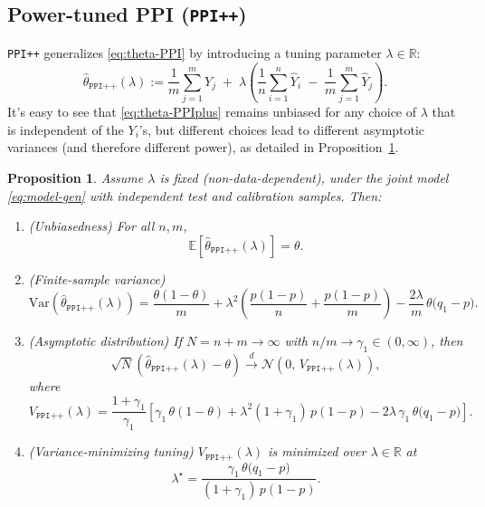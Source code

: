 \documentclass[11pt]{article}
\newcommand{\E}{\mathbb{E}}
\newcommand{\Var}{\mathrm{Var}}
\newcommand{\1}{\mathbf{1}}
\newtheorem{proposition}{Proposition}
\theoremstyle{remark}
\begin{document}
\subsection{Power-tuned PPI (\texttt{PPI++})}
\label{subsec:PPIplus}
\texttt{PPI++} generalizes \eqref{eq:theta-PPI} by introducing a tuning parameter $\lambda\in\mathbb{R}$:
\begin{equation}
\hat\theta_{\mathrm{\texttt{PPI++}}}(\lambda)
:=
\frac{1}{m}\sum_{j=1}^m Y_j
\;+\;
\lambda\left(
\frac{1}{n}\sum_{i=1}^n \hat Y_i
\;-\;
\frac{1}{m}\sum_{j=1}^m \hat Y_j
\right).
\label{eq:theta-PPIplus}
\end{equation}
It's easy to see that \eqref{eq:theta-PPIplus} remains unbiased for any choice of $\lambda$ that is independent of the $Y_i$'s, but different choices lead to different asymptotic variances (and therefore different power), as detailed in Proposition~\ref{prop:PPIplus-bias-var}.


\begin{proposition}
\label{prop:PPIplus-bias-var}
Assume $\lambda$ is fixed (non-data-dependent), under the joint model \eqref{eq:model-gen} with independent test and calibration samples. Then:
\begin{enumerate}[label=(\roman*),leftmargin=1.5em]
\item \emph{(Unbiasedness)} For all $n,m$,
\[
\E\!\left[\hat\theta_{\mathrm{\texttt{PPI++}}}(\lambda)\right] = \theta.
\]

\item \emph{(Finite-sample variance)}
\begin{equation}
\Var\!\left(\hat\theta_{\mathrm{\texttt{PPI++}}}(\lambda)\right)
=
\frac{\theta(1-\theta)}{m}
+
\lambda^2\left(\frac{p(1-p)}{n}+\frac{p(1-p)}{m}\right)
-
\frac{2\lambda}{m}\,\theta\bigl(q_1-p\bigr).
\label{eq:ppiplus-var-finite}
\end{equation}

\item \emph{(Asymptotic distribution)}
If $N=n+m\to\infty$ with $n/m\to\gamma_1\in(0,\infty)$, then
\[
\sqrt{N}\left(\hat\theta_{\mathrm{\texttt{PPI++}}}(\lambda)-\theta\right)
\xrightarrow{d}
\mathcal N\!\left(0,\,V_{\mathrm{\texttt{PPI++}}}(\lambda)\right),
\]
where
\begin{equation}
V_{\mathrm{\texttt{PPI++}}}(\lambda)
=
\frac{1+\gamma_1}{\gamma_1}\left[\gamma_1\,\theta(1-\theta)
+
\lambda^2(1+\gamma_1)\,p(1-p)
-
2\lambda\,\gamma_1\,\theta\bigl(q_1-p\bigr)\right].
\label{eq:ppiplus-var-asymp}
\end{equation}

\item \emph{(Variance-minimizing tuning)}
$V_{\mathrm{\texttt{PPI++}}}(\lambda)$ is minimized over $\lambda\in\mathbb{R}$ at
\[
\lambda^\star
=
\frac{\gamma_1\,\theta\bigl(q_1-p\bigr)}{(1+\gamma_1)\,p(1-p)}.
\]
\end{enumerate}
\end{proposition}
\end{document}
